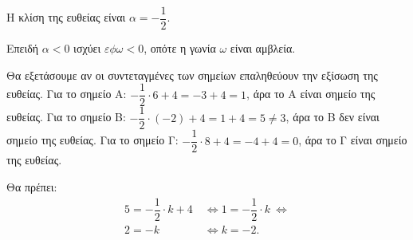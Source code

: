 
\begin{alist}
\item 
\begin{rlist}
\item Η κλίση της ευθείας είναι $\alpha = -\dfrac{1}{2}$.
\item Επειδή $\alpha < 0$ ισχύει $\varepsilon\phi\omega < 0$, οπότε η γωνία $\omega$ είναι αμβλεία.
\end{rlist}

\item Θα εξετάσουμε αν οι συντεταγμένες των σημείων επαληθεύουν την εξίσωση της ευθείας.
Για το σημείο Α: $-\dfrac{1}{2} \cdot 6 + 4 = -3 + 4 = 1$, άρα το Α είναι σημείο της ευθείας.
Για το σημείο Β: $-\dfrac{1}{2} \cdot (-2) + 4 = 1 + 4 = 5 \ne 3$, άρα το Β δεν είναι σημείο της ευθείας.
Για το σημείο Γ: $-\dfrac{1}{2} \cdot 8 + 4 = -4 + 4 = 0$, άρα το Γ είναι σημείο της ευθείας.

\item Θα πρέπει:
\begin{align*}
5 = -\dfrac{1}{2} \cdot k + 4 \ &\Leftrightarrow 
1 = -\dfrac{1}{2} \cdot k \ \Leftrightarrow \\
2 = -k \ &\Leftrightarrow 
k = -2.
\end{align*}
\end{alist}

